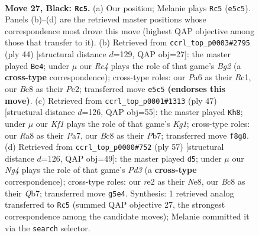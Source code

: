 \documentclass[11pt]{article}
\begin{document}
\clearpage

\begin{figure}[p]\centering
\begin{subfigure}{0.46\textwidth}\centering
\resizebox{\linewidth}{!}{%
\newchessgame
\chessboard[
  setfen={r1bn1k2/1p1p1pp1/p1Pq4/4r1np/QB5N/4P1P1/PP2RPBP/1R4K1 b - - 0 27},
  showmover=false,
  pgfstyle=straightmove, color=movearrow, markmove={e5-c5}
]}
\caption{}
\end{subfigure}\hfill
\begin{subfigure}{0.46\textwidth}\centering
\resizebox{\linewidth}{!}{%
\newchessgame
\chessboard[
  setfen={r2nr1k1/1pq1pp1p/4b1p1/p3N2P/2P2Q2/6P1/3RPPB1/2R3K1 w - - 3 23},
  showmover=false,
  pgfstyle=straightmove, color=movearrow, markmove={g2-e4}
]}
\caption{}
\end{subfigure}
\\[4pt]
\begin{subfigure}{0.46\textwidth}\centering
\resizebox{\linewidth}{!}{%
\newchessgame
\chessboard[
  setfen={5rk1/pp1rn1pp/3n1p2/3p1Pq1/3P4/1BN1P1Q1/PP3R1P/R5K1 b - - 4 24},
  showmover=false,
  pgfstyle=straightmove, color=movearrow, markmove={g8-h8}
]}
\caption{}
\end{subfigure}\hfill
\begin{subfigure}{0.46\textwidth}\centering
\resizebox{\linewidth}{!}{%
\newchessgame
\chessboard[
  setfen={4n1k1/1q2rpbp/r2p1np1/5PB1/1pN1P3/2P4Q/1P4PP/1B2RR1K b - - 0 29},
  showmover=false,
  pgfstyle=straightmove, color=movearrow, markmove={d6-d5}
]}
\caption{}
\end{subfigure}
\caption{\textbf{Move 27, Black: \texttt{Rc5}.} (a) Our position; Melanie plays \texttt{Rc5} (\texttt{e5c5}). Panels (b)--(d) are the retrieved master positions whose correspondence most drove this move (highest QAP objective among those that transfer to it). (b) Retrieved from \texttt{ccrl\_top\_p0003\#2795} (ply 44) [structural distance $d$=129, QAP obj=27]: the master played \texttt{Be4}; under $\mu$ our \emph{Re4} plays the role of that game's \emph{Bg2} (a \textbf{cross-type} correspondence); cross-type roles: our \emph{P}a6 as their \emph{R}c1, our \emph{B}c8 as their \emph{P}e2; transferred move \texttt{e5c5} \textbf{(endorses this move)}. (c) Retrieved from \texttt{ccrl\_top\_p0001\#1313} (ply 47) [structural distance $d$=126, QAP obj=55]: the master played \texttt{Kh8}; under $\mu$ our \emph{Kf1} plays the role of that game's \emph{Kg1}; cross-type roles: our \emph{R}a8 as their \emph{P}a7, our \emph{B}c8 as their \emph{P}b7; transferred move \texttt{f8g8}. (d) Retrieved from \texttt{ccrl\_top\_p0000\#752} (ply 57) [structural distance $d$=126, QAP obj=49]: the master played \texttt{d5}; under $\mu$ our \emph{Ng4} plays the role of that game's \emph{Pd3} (a \textbf{cross-type} correspondence); cross-type roles: our \emph{r}e2 as their \emph{N}e8, our \emph{B}c8 as their \emph{Q}b7; transferred move \texttt{g5e4}. Synthesis: 1 retrieved analog transferred to \texttt{Rc5} (summed QAP objective 27, the strongest correspondence among the candidate moves); Melanie committed it via the \texttt{search} selector.}
\label{fig:thought-m53}
\end{figure}
\end{document}
